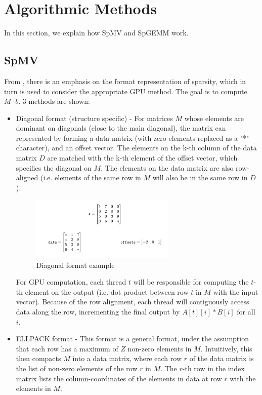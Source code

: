 \documentclass[12pt]{article}
\begin{document}
\section{Algorithmic Methods}
\hspace{0.5cm}In this section, we explain how SpMV and SpGEMM work.

\subsection{SpMV}
\hspace{0.5cm}From \cite{spmv_cuda}, there is an emphasis on the format representation of sparsity, which in turn is used to consider the appropriate GPU method. The goal is to compute $M \cdot b$. 3 methods are shown: 

\begin{itemize}
\item Diagonal format (structure specific) - For matrices $M$ whose elements are dominant on diagonals (close to the main diagonal), the matrix can represented by forming a data matrix (with zero-elements replaced as a "*" character), and an offset vector. The elements on the k-th column of the data matrix $D$ are matched with the k-th element of the offset vector, which specifies the diagonal on $M$. The elements on the data matrix are also row-aligned (i.e. elements of the same row in $M$ will also be in the same row in $D$). 

\begin{figure}[h]
  \caption{Diagonal format example}
  \centering 
  \includegraphics[width = 0.65\textwidth]{diagonal.png}
\end{figure}



\hspace{0.5cm}For GPU computation, each thread $t$ will be responsible for computing the $t$-th element on the output (i.e. dot product between row $t$ in $M$ with the input vector). Because of the row alignment, each thread will contiguously access data along the row, incrementing the final output by $ A[t][i]*B[i] $ for all $i$. 
\item ELLPACK format - This format is a general format, under the assumption that each row has a maximum of $Z$ non-zero elements in $M$. Intuitively, this then compacts $M$ into a data matrix, where each row $r$ of the data matrix is the list of non-zero elements of the row $r$ in $M$. The $r$-th row in the index matrix lists the column-coordinates of the elements in data at row $r$ with the elements in $M$. 



\end{itemize}
\end{document}
